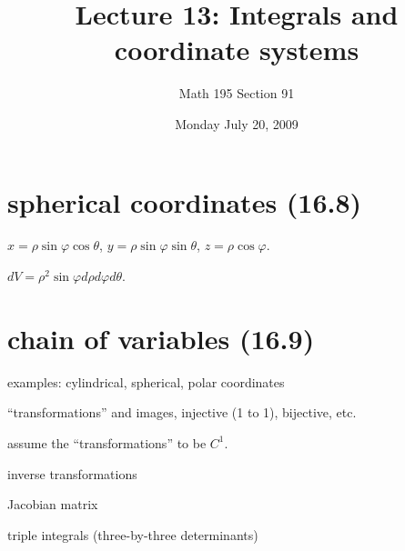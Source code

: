 \documentclass[12pt]{article}
\title{Lecture 13: Integrals and coordinate systems}
\author{Math 195 Section 91}
\date{Monday July 20, 2009}
\begin{document}
\maketitle

\section{spherical coordinates (16.8)}

$x = \rho \sin \varphi \cos \theta $,
$y = \rho \sin \varphi \sin \theta $,
$z = \rho \cos \varphi$.

$dV = \rho^2 \sin \varphi d\rho d\varphi d\theta$.

\section{chain of variables (16.9)}

examples: cylindrical, spherical, polar coordinates

``transformations'' and images, injective (1 to 1), bijective, etc.

assume the ``transformations'' to be $C^1$.

inverse transformations

Jacobian matrix

triple integrals (three-by-three determinants)
\end{document}
